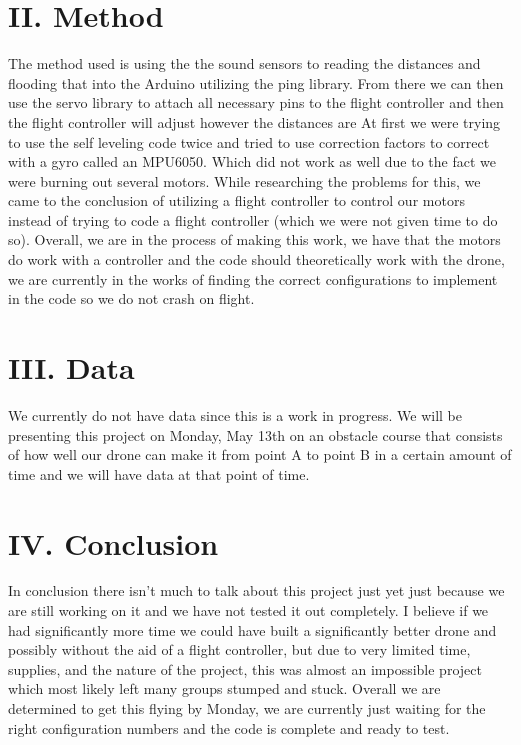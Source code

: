 \documentclass[aps,prl,twocolumn,showpacs,superscriptaddress,groupedaddress]{revtex4}  %
\begin{document}
\section{\label{sec: level2}II. Method}
The method used is using the the sound sensors to reading the distances and flooding that into the Arduino utilizing the ping library. From there we can then use the servo library to attach all necessary pins to the flight controller and then the flight controller will adjust however the distances are  At first we were trying to use the self leveling code twice and tried to use correction factors to correct with a gyro called an MPU6050. Which did not work as well due to the fact we were burning out several motors. While researching the problems for this, we came to the conclusion of utilizing a flight controller to control our motors instead of trying to code a flight controller (which we were not given time to do so). Overall, we are in the process of making this work, we have that the motors do work with a controller and the code should theoretically work with the drone, we are currently in the works of finding the correct configurations to implement in the code so we do not crash on flight. 



\section{\label{sec: level3}III. Data}
We currently do not have data since this is a work in progress. We will be presenting this project on Monday, May 13th on an obstacle  course that consists of how well our drone can make it from point A to point B in a certain amount of time and we will have data at that point of time. 

\section{\label{sec: level4}IV. Conclusion}
In conclusion there isn't much to talk about this project just yet just because we are still working on it and we have not tested it out completely. I believe if we had significantly more time we could have built a significantly better drone and possibly without the aid of a flight controller, but due to very limited time, supplies, and the nature of the project, this was almost an impossible project which most likely left many groups stumped and stuck. Overall we are determined to get this flying by Monday, we are currently just waiting for the right configuration numbers and the code is complete and ready to test. 
\end{document}
